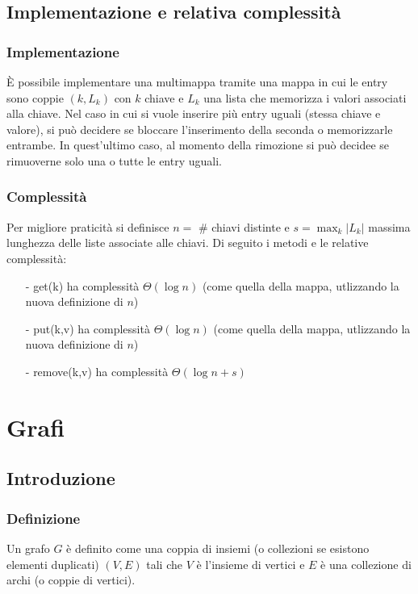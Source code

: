 \documentclass[a4paper]{article}
\begin{document}
\subsection{Implementazione e relativa complessità}
\subsubsection*{Implementazione}
È possibile implementare una multimappa tramite una mappa in cui le entry sono coppie \((k, L_k)\) con \(k\) chiave e \(L_k\) una
lista che memorizza i valori associati alla chiave. Nel caso in cui si vuole inserire più entry uguali (stessa chiave e valore),
si può decidere se bloccare l'inserimento della seconda o memorizzarle entrambe. In quest'ultimo caso, al momento della rimozione
si può decidee se rimuoverne solo una o tutte le entry uguali.

\subsubsection*{Complessità}
Per migliore praticità si definisce \(n =\) \# chiavi distinte e \(s = \max_k |L_k|\) massima lunghezza delle liste associate
alle chiavi. Di seguito i metodi e le relative complessità:
\begin{itemize}[topsep=3pt, itemsep=0pt]
	\item[-] get(k) ha complessità \(\Theta(\log n)\) (come quella della mappa, utlizzando la nuova definizione di \(n\))
	\item[-] put(k,v) ha complessità \(\Theta(\log n)\) (come quella della mappa, utlizzando la nuova definizione di \(n\))
	\item[-] remove(k,v) ha complessità \(\Theta(\log n + s)\)
\end{itemize}

\newpage

\section{Grafi}
\subsection{Introduzione}
\subsubsection*{Definizione}
Un grafo \(G\) è definito come una coppia di insiemi (o collezioni se esistono elementi duplicati) \((V, E)\) tali che \(V\)
è l'insieme di vertici e \(E\) è una collezione di archi (o coppie di vertici). 
\end{document}
